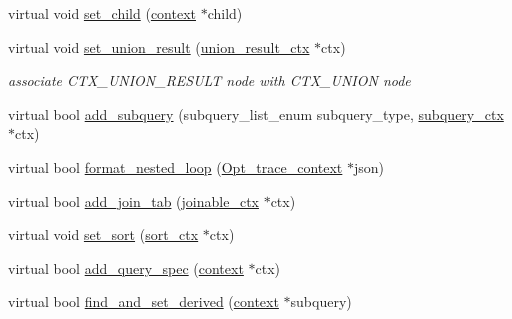 \begin{DoxyCompactItemize}
\item 
virtual void \mbox{\hyperlink{classopt__explain__json__namespace_1_1context_a16f5a188524441f0bf60b88edc779fa6}{set\+\_\+child}} (\mbox{\hyperlink{classopt__explain__json__namespace_1_1context}{context}} $\ast$child)
\item 
\mbox{\label{classopt__explain__json__namespace_1_1context_a74e80dadae3e5aac5c32e8510d43ccea}} 
virtual void \mbox{\hyperlink{classopt__explain__json__namespace_1_1context_a74e80dadae3e5aac5c32e8510d43ccea}{set\+\_\+union\+\_\+result}} (\mbox{\hyperlink{classopt__explain__json__namespace_1_1union__result__ctx}{union\+\_\+result\+\_\+ctx}} $\ast$ctx)
\begin{DoxyCompactList}\small\item\em associate C\+T\+X\+\_\+\+U\+N\+I\+O\+N\+\_\+\+R\+E\+S\+U\+LT node with C\+T\+X\+\_\+\+U\+N\+I\+ON node \end{DoxyCompactList}\item 
virtual bool \mbox{\hyperlink{classopt__explain__json__namespace_1_1context_ad9df2d2b16093c51e1c5557227b2fd56}{add\+\_\+subquery}} (subquery\+\_\+list\+\_\+enum subquery\+\_\+type, \mbox{\hyperlink{classopt__explain__json__namespace_1_1subquery__ctx}{subquery\+\_\+ctx}} $\ast$ctx)
\item 
virtual bool \mbox{\hyperlink{classopt__explain__json__namespace_1_1context_ab1aae5d8b971fc1fd381c68f592b0838}{format\+\_\+nested\+\_\+loop}} (\mbox{\hyperlink{classOpt__trace__context}{Opt\+\_\+trace\+\_\+context}} $\ast$json)
\item 
virtual bool \mbox{\hyperlink{classopt__explain__json__namespace_1_1context_a3f7a03f0bf2a519a19b84cb5a99ee304}{add\+\_\+join\+\_\+tab}} (\mbox{\hyperlink{classopt__explain__json__namespace_1_1joinable__ctx}{joinable\+\_\+ctx}} $\ast$ctx)
\item 
virtual void \mbox{\hyperlink{classopt__explain__json__namespace_1_1context_ad2ea8a178f9b0faacf2d76a43447048f}{set\+\_\+sort}} (\mbox{\hyperlink{classopt__explain__json__namespace_1_1sort__ctx}{sort\+\_\+ctx}} $\ast$ctx)
\item 
virtual bool \mbox{\hyperlink{classopt__explain__json__namespace_1_1context_a78bdde3b4bea092ee885bfb0647f08cb}{add\+\_\+query\+\_\+spec}} (\mbox{\hyperlink{classopt__explain__json__namespace_1_1context}{context}} $\ast$ctx)
\item 
virtual bool \mbox{\hyperlink{classopt__explain__json__namespace_1_1context_afe66d6ec1a0f56114bc2b493b084c1a0}{find\+\_\+and\+\_\+set\+\_\+derived}} (\mbox{\hyperlink{classopt__explain__json__namespace_1_1context}{context}} $\ast$subquery)

\end{DoxyCompactItemize}
